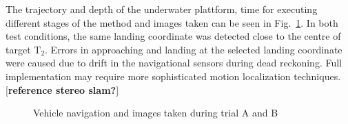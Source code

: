 The trajectory and depth of the underwater plattform,  time for executing different stages of the method and images taken can be seen in Fig.~\ref{f:trial_lpoint_xy_depth}. In both test conditions, the same landing coordinate was detected close to the centre of target T$_2$. Errors in approaching and landing at the selected landing coordinate were caused due to drift in the navigational sensors during dead reckoning. Full implementation may require more sophisticated motion localization techniques. [\textbf{reference stereo slam?}]

\begin{figure}[!ht]
\centering
{}
\quad
{}
\quad
{}
\caption{Vehicle navigation and images taken during trial A and B}
\label{f:trial_lpoint_xy_depth}
\end{figure}